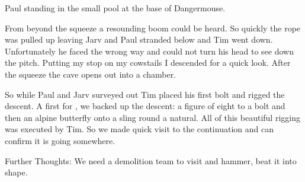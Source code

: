 \begin{marginfigure}
\checkoddpage \ifoddpage \forcerectofloat \else \forceversofloat \fi
\centering
 \caption{Paul standing in the small pool at the base of Dangermouse. }
 \label{dangermouse pool}
\end{marginfigure}

From beyond the squeeze a resounding boom could be heard. So quickly the rope was pulled up leaving Jarv and Paul stranded below and Tim went down. Unfortunately he faced the wrong way and could not turn his head to see down the pitch. Putting my stop on my cowstails I descended for a
quick look. After the squeeze the cave opens out into a chamber.

So while Paul and Jarv surveyed out Tim placed his first bolt and rigged the descent. A first for , we backed up the descent: a figure of eight to a bolt and then an alpine butterfly onto a sling round a natural. All of this beautiful rigging was executed by Tim. So we made quick visit to the continuation and can confirm it is going somewhere.

Further Thoughts: We need a demolition team to visit  and hammer, beat it into shape.



